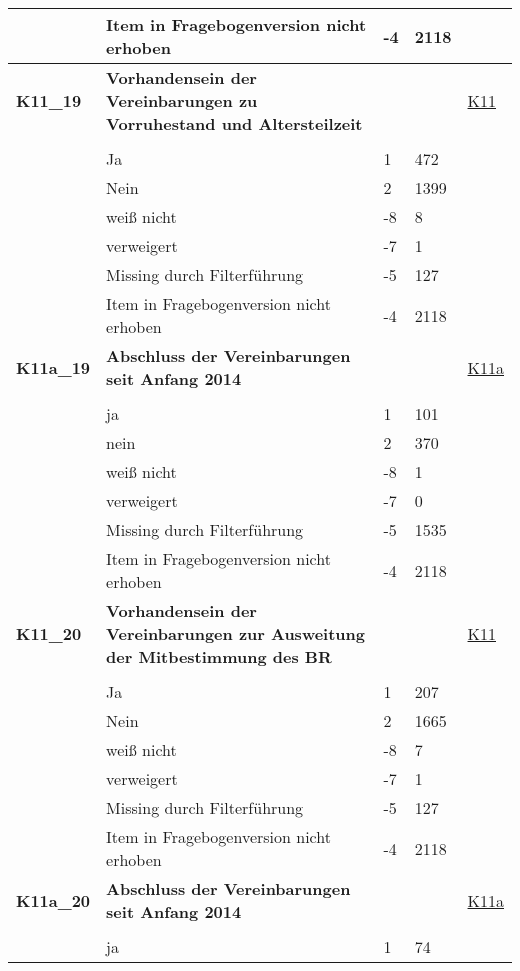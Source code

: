 \begin{longtable}{| L{2.5cm} | L{8.25cm}| C{1.5cm} | R{1.25cm} | C{2.25cm} |  }
   & Item in Fragebogenversion nicht erhoben & -4 & 2118 &  \\ 
   \midrule
\textbf{K11\_19}\label{var:suf:K11:19} & \textbf{Vorhandensein der Vereinbarungen zu Vorruhestand und Altersteilzeit} &  &  & \hyperref[K11]{K11} \\ 
   &  &  &  &  \\ 
   & Ja & 1 & 472 &  \\ 
   & Nein & 2 & 1399 &  \\ 
   & weiß nicht & -8 & 8 &  \\ 
   & verweigert & -7 & 1 &  \\ 
   & Missing durch Filterführung & -5 & 127 &  \\ 
   & Item in Fragebogenversion nicht erhoben & -4 & 2118 &  \\ 
   \midrule
\textbf{K11a\_19}\label{var:suf:K11a:19} & \textbf{Abschluss der Vereinbarungen seit Anfang 2014} &  &  & \hyperref[K11a]{K11a} \\ 
   &  &  &  &  \\ 
   & ja & 1 & 101 &  \\ 
   & nein & 2 & 370 &  \\ 
   & weiß nicht & -8 & 1 &  \\ 
   & verweigert & -7 & 0 &  \\ 
   & Missing durch Filterführung & -5 & 1535 &  \\ 
   & Item in Fragebogenversion nicht erhoben & -4 & 2118 &  \\ 
   \midrule
\textbf{K11\_20}\label{var:suf:K11:20} & \textbf{Vorhandensein der Vereinbarungen zur Ausweitung der Mitbestimmung des BR} &  &  & \hyperref[K11]{K11} \\ 
   &  &  &  &  \\ 
   & Ja & 1 & 207 &  \\ 
   & Nein & 2 & 1665 &  \\ 
   & weiß nicht & -8 & 7 &  \\ 
   & verweigert & -7 & 1 &  \\ 
   & Missing durch Filterführung & -5 & 127 &  \\ 
   & Item in Fragebogenversion nicht erhoben & -4 & 2118 &  \\ 
   \midrule
\textbf{K11a\_20}\label{var:suf:K11a:20} & \textbf{Abschluss der Vereinbarungen seit Anfang 2014} &  &  & \hyperref[K11a]{K11a} \\ 
   &  &  &  &  \\ 
   & ja & 1 & 74 &  \\ 

\end{longtable}
